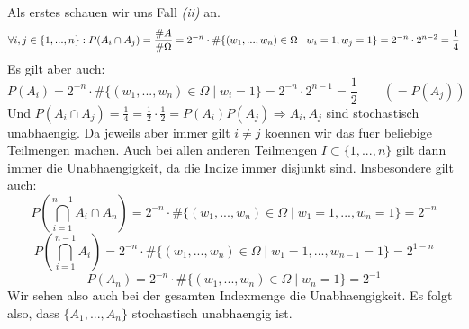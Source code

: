 \documentclass[a4paper]{article}
\newenvironment{Aufgabe}[2][Aufgabe]{\begin{trivlist}
\item[\hskip \labelsep {\bfseries #1}\hskip \labelsep {\bfseries #2.}]}{\end{trivlist}}
\begin{document}
\maketitle
	\begin{Aufgabe}{5}
		Als erstes schauen wir uns Fall \textit{(ii)} an.
		\[
			\forall i, j \in \{
				1, ..., n
			\}:
			P(A_i \cap A_j) = \frac{ \# A }{ \# \Omega } =
			2^{-n} \cdot \# \{
				(w_1, ..., w_n) \in \Omega \; \vert \; 
				w_i = 1, w_j = 1
			\} = 2^{-n} \cdot 2^{n-2} = \frac{ 1 }{ 4 } \\
		\] 
		Es gilt aber auch:
		\[
			P(A_i) = 2^{-n} \cdot \# \{
				(w_1, ..., w_n) \in \Omega \; \vert \; 
				w_i = 1
			\} = 2^{-n} \cdot 2^{n-1} = \frac{ 1 }{ 2 }
			\qquad (= P(A_j))
		\] 
		Und $P(A_i \cap A_j) = \frac{ 1 }{ 4 } = \frac{ 1 }{ 2 } \cdot \frac{ 1 }{ 2 } = P(A_i) P(A_j)
		\Rightarrow A_i, A_j$ sind stochastisch unabhaengig.
		Da jeweils aber immer gilt $i\neq j$ koennen wir das fuer beliebige Teilmengen machen. Auch bei
		allen anderen Teilmengen $I \subset \{
			1, ..., n
		\} $ gilt dann immer die Unabhaengigkeit, da die Indize immer disjunkt sind.
		Insbesondere gilt auch:
		\[
			P\left(
				\bigcap_{i=1}^{n-1} A_i \cap A_n
			\right) = 2 ^{-n} \cdot \# \{
				(w_1, ..., w_n) \in \Omega \; \vert \;
				w_1 = 1, ..., w_n = 1
			\} = 2^{-n}
		\] 
		\[
			P\left(
				\bigcap_{i=1}^{n-1} A_i
			\right) = 2 ^{-n} \cdot \# \{
				(w_1, ..., w_n) \in \Omega \; \vert \;
				w_1 = 1, ..., w_{n-1} = 1
			\} = 2 ^{1-n}
		\] 
		\[
		P\left(
			A_n
		\right) = 2 ^{-n} \cdot \# \{
			(w_1, ..., w_n) \in \Omega \; \vert \;
			w_n = 1
		\} = 2^{-1}
		\] 
		Wir sehen also auch bei der gesamten Indexmenge die Unabhaengigkeit.
		Es folgt also, dass $\{
			A_1, ..., A_n
		\} $ stochastisch unabhaengig ist.
		\\
		

\end{Aufgabe}
\end{document}
